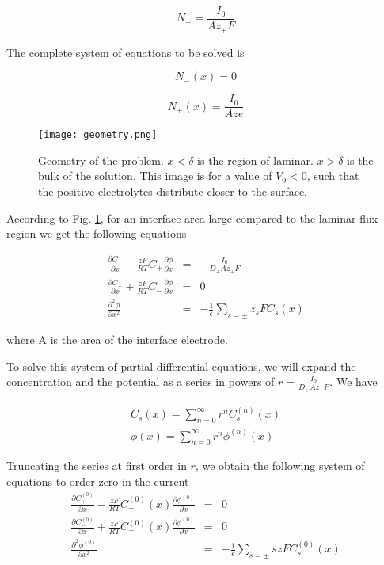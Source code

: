 $$N_+ = \frac{I_0}{Az_+F}$$

The complete system of equations to be solved is

$$N_-(x) = 0$$

$$N_+(x) = \frac{I_0}{Aze}$$

\begin{figure}[h!]
\centering
	\texttt{[image: geometry.png]}
	\caption{Geometry of the problem. $x<\delta$ is the region of laminar. $x>\delta$ is the bulk of the solution. This image is for a value of $V_0<0$, such that the positive electrolytes distribute closer to the surface.}
\label{fig:geometry}
\end{figure}


According to Fig. \ref{fig:geometry}, for an interface area large compared to the laminar flux region we get the following equations 

\begin{eqnarray}
\label{eq:system}
\frac{\partial C_+}{\partial x}-\frac{z F}{RT}C_+\frac{\partial \phi}{\partial x} &=& -\frac{I_0}{D_+Az_+ F}\label{eq:eq1} \\
\frac{\partial C_-}{\partial x}+\frac{z F}{RT}C_-\frac{\partial \phi}{\partial x} &=& 0 \label{eq:eq2}\\
\frac{\partial^2 \phi}{\partial x^2} &=& -\frac{1}{\epsilon} \sum_{s=\pm}z_s F C_s(x)\label{eq:eq3}
\end{eqnarray}

where A is the area of the interface electrode. 

To solve this system of partial differential equations, we will expand the concentration and the potential as a series in powers of $r = \frac{I_0}{D_+Az_+ F}$. We have

\begin{eqnarray}
\label{eq:perturbation-theory}
C_s(x) = \sum_{n=0}^{\infty}r^n C_s^{(n)}(x)\\
\label{eq:perturbation-theory2}
\phi(x) = \sum_{n=0}^{\infty}r^n \phi^{(n)}(x)
\end{eqnarray}

Truncating the series at first order in $r$, we obtain the following system of equations to order zero in the current
\begin{eqnarray}
\frac{\partial C^{(0)}_+}{\partial x}-\frac{zF}{RT}C^{(0)}_+(x)\frac{\partial \phi^{(0)}}{\partial x} &=& 0\\
\label{eq:concentration-diff-zero1}
\frac{\partial C^{(0)}_-}{\partial x}+\frac{zF}{RT}C^{(0)}_-(x)\frac{\partial \phi^{(0)}}{\partial x}&=& 0\\
\label{eq:concentration-diff-zero2}
\frac{\partial^2  \phi^{(0)}}{\partial x^2} &=& -\frac{1}{\epsilon}\sum_{s= \pm} szF C^{(0)}_{s}(x)
\label{eq:concentration-diff-zero3}
\end{eqnarray}

